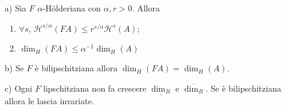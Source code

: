 \begin{proposizione}
\begin{itemize}
	\item[a)] Sia $F$ $\alpha$-Hölderiana con $\alpha,r>0$. Allora
	\begin{enumerate}
		\item $\forall s$, $\mathcal H^{s/\alpha}(FA)\leq r^{s/\alpha}\mathcal H^{s}(A)$;
		\item $\dim_{H}(FA) \leq \alpha^{-1}\dim_{H}(A)$
	\end{enumerate}
	\item[b)] Se $F$ è bilipschitziana allora $\dim_{H}(FA) = \dim_{H}(A)$.
	\item[c)] Ogni $F$ lipschitziana non fa crescere $\underline{\dim_{B}}$ e $\overline{\dim_{B}}$. Se è bilipschitziana allora le lascia invariate. 
\end{itemize}
\end{proposizione}
